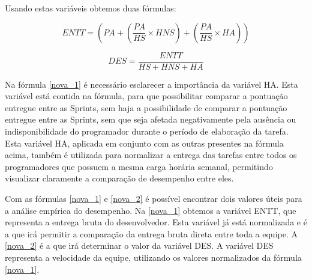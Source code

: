 Usando estas variáveis obtemos duas fórmulas:
\bigskip

\begin{equation} \label{nova_1}
    ENTT = (PA + (\frac{PA}{HS} \times HNS ) + ( \frac{PA}{HS} \times HA )) 
\end{equation}

\bigskip

\begin{equation} \label{nova_2}
    DES = \frac{ENTT}{HS + HNS + HA}
\end{equation}

\bigskip

Na fórmula \ref{nova_1} é necessário esclarecer a importância da variável HA. Esta variável está contida na fórmula, para que possibilitar comparar a pontuação entregue entre as Sprints, sem haja a possibilidade de comparar a pontuação entregue entre as Sprints, sem que seja afetada negativamente pela ausência ou indisponibilidade do programador durante o período de elaboração da tarefa. Esta variável HA, aplicada em conjunto com as outras presentes na fórmula acima, também é utilizada para normalizar a entrega das tarefas entre todos os programadores que possuem a mesma carga horária semanal, permitindo visualizar claramente a comparação de desempenho entre eles.\par

Com as fórmulas \ref{nova_1} e \ref{nova_2} é possível encontrar dois valores úteis para a análise empírica do desempenho. Na \ref{nova_1} obtemos a variável ENTT, que representa a entrega bruta do desenvolvedor. Esta variável já está normalizada e é a que irá permitir a comparação da entrega bruta direta entre toda a equipe. A \ref{nova_2} é a que irá determinar o valor da variável DES. A variável DES representa a velocidade da equipe, utilizando os valores normalizados da fórmula \ref{nova_1}.